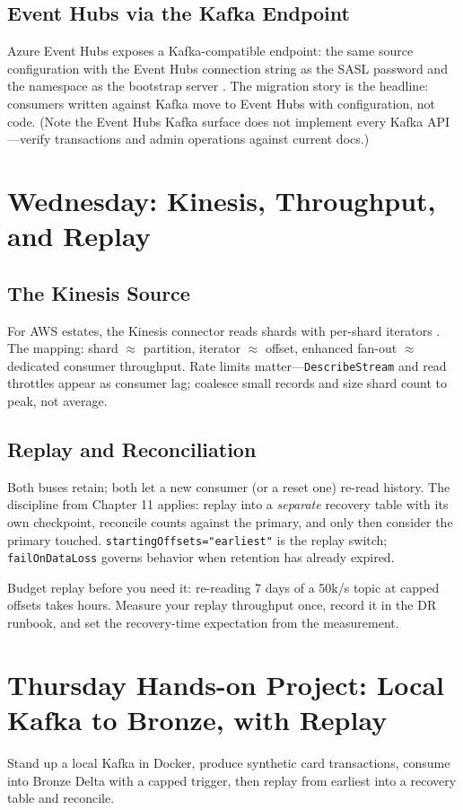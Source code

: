 \subsection{Event Hubs via the Kafka Endpoint}
Azure Event Hubs exposes a Kafka-compatible endpoint: the same source configuration with the Event Hubs connection string as the SASL password and the namespace as the bootstrap server \cite{eventHubsKafka}. The migration story is the headline: consumers written against Kafka move to Event Hubs with configuration, not code. (Note the Event Hubs Kafka surface does not implement every Kafka API---verify transactions and admin operations against current docs.)

\section{Wednesday: Kinesis, Throughput, and Replay}
\subsection{The Kinesis Source}
For AWS estates, the Kinesis connector reads shards with per-shard iterators \cite{kinesisDocs}. The mapping: shard $\approx$ partition, iterator $\approx$ offset, enhanced fan-out $\approx$ dedicated consumer throughput. Rate limits matter---\texttt{DescribeStream} and read throttles appear as consumer lag; coalesce small records and size shard count to peak, not average.

\subsection{Replay and Reconciliation}
Both buses retain; both let a new consumer (or a reset one) re-read history. The discipline from Chapter 11 applies: replay into a \emph{separate} recovery table with its own checkpoint, reconcile counts against the primary, and only then consider the primary touched. \texttt{startingOffsets="earliest"} is the replay switch; \texttt{failOnDataLoss} governs behavior when retention has already expired.

\begin{tipbox}
Budget replay before you need it: re-reading 7 days of a 50k/s topic at capped offsets takes hours. Measure your replay throughput once, record it in the DR runbook, and set the recovery-time expectation from the measurement.
\end{tipbox}

\section{Thursday Hands-on Project: Local Kafka to Bronze, with Replay}
Stand up a local Kafka in Docker, produce synthetic card transactions, consume into Bronze Delta with a capped trigger, then replay from earliest into a recovery table and reconcile.

